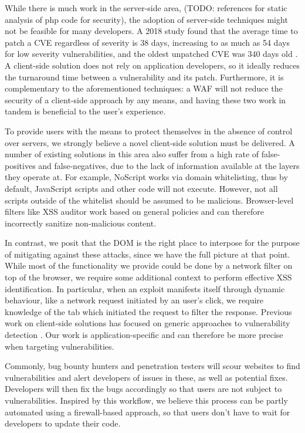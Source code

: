 While there is much work in the server-side area, \cite{Xu:2006:TPE:1267336.1267345,DBLP:conf/sec/Nguyen-TuongGGSE05,Pietraszek:2005:DAI:2146257.2146267,Bisht:2008:XPD:1428322.1428325} (TODO: references for static analysis of php code for security), the adoption of server-side techniques might not be feasible for many developers. A 2018 study found that the average time to patch a CVE regardless of severity is 38 days, increasing to as much as 54 days for low severity vulnerabilities, and the oldest unpatched CVE was 340 days old \cite{Rapid7}. A client-side solution does not rely on application developers, so it ideally reduces the turnaround time between a vulnerability and its patch. Furthermore, it is complementary to the aforementioned techniques: a WAF will not reduce the security of a client-side approach by any means, and having these two work in tandem is beneficial to the user's experience.

To provide users with the means to protect themselves in the absence of control over servers, we strongly believe a novel client-side solution must be delivered. A number of existing solutions in this area also suffer from a high rate of false-positives and false-negatives, due to the lack of information available at the layers they operate at. For example, NoScript works via domain whitelisting, thus by default, JavaScript scripts and other code will not execute. However, not all scripts outside of the whitelist should be assumed to be malicious. Browser-level filters like XSS auditor work based on general policies and can therefore incorrectly sanitize non-malicious content. 

In contrast, we posit that the DOM is the right place to interpose for the purpose of mitigating against these attacks, since we have the full picture at that point. While most of the functionality we provide could be done by a network filter on top of the browser, we require some additional context to perform effective XSS identification. In particular, when an exploit manifests itself through dynamic behaviour, like a network request initiated by an user's click, we require knowledge of the tab which initiated the request to filter the response. Previous work on client-side solutions has focused on generic approaches to vulnerability detection \cite{Kirda:2009:CCS:2639535.2639808,Jim:2007:DSI:1242572.1242654,Hallaraker:2005:DMJ:1078029.1078861}. Our work is application-specific and can therefore be more precise when targeting vulnerabilities. 

Commonly, bug bounty hunters and penetration testers will scour websites to find vulnerabilities and alert developers of issues in these, as well as potential fixes. Developers will then fix the bugs accordingly so that users are not subject to vulnerabilities. Inspired by this workflow, we believe this process can be partly automated using a firewall-based approach, so that users don't have to wait for developers to update their code.


